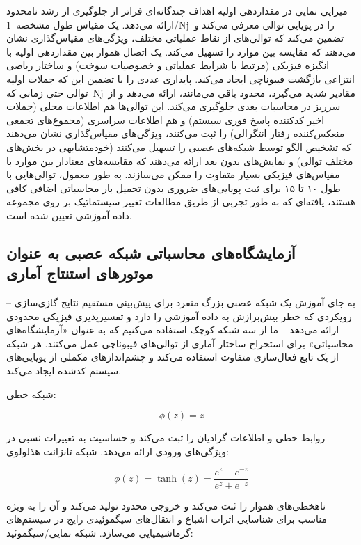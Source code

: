\documentclass[12pt, a4paper]{article}
\begin{document}
میرایی نمایی در مقداردهی اولیه اهداف چندگانه‌ای فراتر از جلوگیری از رشد نامحدود ارائه می‌دهد. یک مقیاس طول مشخصه 1/Nj را در پویایی توالی معرفی می‌کند و تضمین می‌کند که توالی‌های از نقاط عملیاتی مختلف، ویژگی‌های مقیاس‌گذاری نشان می‌دهند که مقایسه بین موارد را تسهیل می‌کند. یک اتصال هموار بین مقداردهی اولیه با انگیزه فیزیکی (مرتبط با شرایط عملیاتی و خصوصیات سوخت) و ساختار ریاضی انتزاعی بازگشت فیبوناچی ایجاد می‌کند. پایداری عددی را با تضمین این که جملات اولیه توالی حتی زمانی که Nj مقادیر شدید می‌گیرد، محدود باقی می‌مانند، ارائه می‌دهد و از سرریز در محاسبات بعدی جلوگیری می‌کند. این توالی‌ها هم اطلاعات محلی (جملات اخیر کدکننده پاسخ فوری سیستم) و هم اطلاعات سراسری (مجموع‌های تجمعی منعکس‌کننده رفتار انتگرالی) را ثبت می‌کنند، ویژگی‌های مقیاس‌گذاری نشان می‌دهند که تشخیص الگو توسط شبکه‌های عصبی را تسهیل می‌کنند (خودمتشابهی در بخش‌های مختلف توالی) و نمایش‌های بدون بعد ارائه می‌دهند که مقایسه‌های معنادار بین موارد با مقیاس‌های فیزیکی بسیار متفاوت را ممکن می‌سازند. به طور معمول، توالی‌هایی با طول ۱۰ تا ۱۵ برای ثبت پویایی‌های ضروری بدون تحمیل بار محاسباتی اضافی کافی هستند، یافته‌ای که به طور تجربی از طریق مطالعات تغییر سیستماتیک بر روی مجموعه داده آموزشی تعیین شده است.

\subsection{آزمایشگاه‌های محاسباتی شبکه عصبی به عنوان موتورهای استنتاج آماری}

به جای آموزش یک شبکه عصبی بزرگ منفرد برای پیش‌بینی مستقیم نتایج گازی‌سازی – رویکردی که خطر بیش‌برازش به داده آموزشی را دارد و تفسیرپذیری فیزیکی محدودی ارائه می‌دهد – ما از سه شبکه کوچک استفاده می‌کنیم که به عنوان «آزمایشگاه‌های محاسباتی» برای استخراج ساختار آماری از توالی‌های فیبوناچی عمل می‌کنند. هر شبکه از یک تابع فعال‌سازی متفاوت استفاده می‌کند و چشم‌اندازهای مکملی از پویایی‌های سیستم کدشده ایجاد می‌کند.

شبکه خطی:

\begin{equation}
\phi(z)=z
\end{equation}

روابط خطی و اطلاعات گرادیان را ثبت می‌کند و حساسیت به تغییرات نسبی در ویژگی‌های ورودی ارائه می‌دهد. شبکه تانژانت هذلولوی:

\begin{equation}
\phi(z)=\tanh(z)=\frac{e^{z}-e^{-z}}{e^{z}+e^{-z}}
\end{equation}

ناهخطی‌های هموار را ثبت می‌کند و خروجی محدود تولید می‌کند و آن را به ویژه مناسب برای شناسایی اثرات اشباع و انتقال‌های سیگموئیدی رایج در سیستم‌های گرماشیمیایی می‌سازد. شبکه نمایی/سیگموئید:
\end{document}
